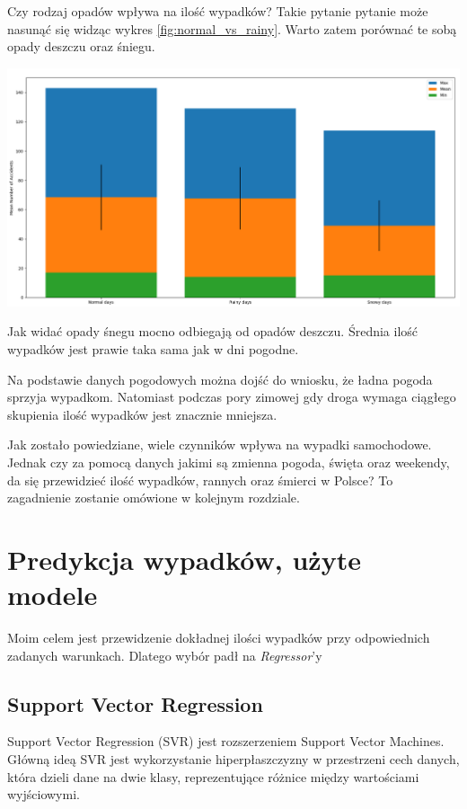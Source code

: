 \documentclass{article}
\begin{document}
Czy rodzaj opadów wpływa na ilość wypadków? Takie pytanie pytanie może nasunąć się widząc wykres \ref{fig:normal_vs_rainy}. Warto zatem porównać te sobą opady deszczu oraz śniegu.

 \begin{center}
    \includegraphics[scale=0.3]{visualization/rain_vs_snow.png}
    \captionsetup{hypcap=false}
    \label{fig:normal_vs_rainy_snow}
\end{center}
Jak widać opady śnegu mocno odbiegają od opadów deszczu. Średnia ilość wypadków jest prawie taka sama jak w dni pogodne. 

Na podstawie danych pogodowych można dojść do wniosku, że ładna pogoda sprzyja wypadkom. Natomiast podczas pory zimowej gdy droga wymaga ciągłego skupienia ilość wypadków jest znacznie mniejsza.

Jak zostało powiedziane, wiele czynników wpływa na wypadki samochodowe. Jednak czy za pomocą danych jakimi są zmienna pogoda, święta oraz weekendy, da się przewidzieć ilość wypadków, rannych oraz śmierci w Polsce?
To zagadnienie zostanie omówione w kolejnym rozdziale.

\section{Predykcja wypadków, użyte modele}

Moim celem jest przewidzenie dokładnej ilości wypadków przy odpowiednich zadanych warunkach. Dlatego wybór padł na \textit{Regressor}'y

\subsection{Support Vector Regression}
Support Vector Regression (SVR) jest rozszerzeniem Support Vector Machines. Główną ideą SVR jest wykorzystanie hiperpłaszczyzny w przestrzeni cech danych, która dzieli dane na dwie klasy, reprezentujące różnice między wartościami wyjściowymi.
\end{document}
